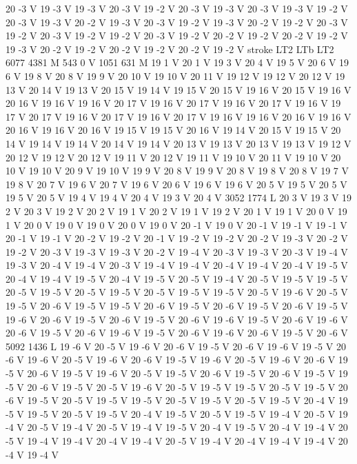 {{{{{20 -3 V
19 -3 V
19 -3 V
20 -3 V
19 -2 V
20 -3 V
19 -3 V
20 -3 V
19 -3 V
19 -2 V
20 -3 V
19 -3 V
20 -2 V
19 -3 V
20 -3 V
19 -2 V
19 -3 V
20 -2 V
19 -2 V
20 -3 V
19 -2 V
20 -3 V
19 -2 V
19 -2 V
20 -3 V
19 -2 V
20 -2 V
19 -2 V
20 -2 V
19 -2 V
19 -3 V
20 -2 V
19 -2 V
20 -2 V
19 -2 V
20 -2 V
19 -2 V
stroke
LT2
LTb
LT2
6077 4381 M
543 0 V
1051 631 M
19 1 V
20 1 V
19 3 V
20 4 V
19 5 V
20 6 V
19 6 V
19 8 V
20 8 V
19 9 V
20 10 V
19 10 V
20 11 V
19 12 V
19 12 V
20 12 V
19 13 V
20 14 V
19 13 V
20 15 V
19 14 V
19 15 V
20 15 V
19 16 V
20 15 V
19 16 V
20 16 V
19 16 V
19 16 V
20 17 V
19 16 V
20 17 V
19 16 V
20 17 V
19 16 V
19 17 V
20 17 V
19 16 V
20 17 V
19 16 V
20 17 V
19 16 V
19 16 V
20 16 V
19 16 V
20 16 V
19 16 V
20 16 V
19 15 V
19 15 V
20 16 V
19 14 V
20 15 V
19 15 V
20 14 V
19 14 V
19 14 V
20 14 V
19 14 V
20 13 V
19 13 V
20 13 V
19 13 V
19 12 V
20 12 V
19 12 V
20 12 V
19 11 V
20 12 V
19 11 V
19 10 V
20 11 V
19 10 V
20 10 V
19 10 V
20 9 V
19 10 V
19 9 V
20 8 V
19 9 V
20 8 V
19 8 V
20 8 V
19 7 V
19 8 V
20 7 V
19 6 V
20 7 V
19 6 V
20 6 V
19 6 V
19 6 V
20 5 V
19 5 V
20 5 V
19 5 V
20 5 V
19 4 V
19 4 V
20 4 V
19 3 V
20 4 V
3052 1774 L
20 3 V
19 3 V
19 2 V
20 3 V
19 2 V
20 2 V
19 1 V
20 2 V
19 1 V
19 2 V
20 1 V
19 1 V
20 0 V
19 1 V
20 0 V
19 0 V
19 0 V
20 0 V
19 0 V
20 -1 V
19 0 V
20 -1 V
19 -1 V
19 -1 V
20 -1 V
19 -1 V
20 -2 V
19 -2 V
20 -1 V
19 -2 V
19 -2 V
20 -2 V
19 -3 V
20 -2 V
19 -2 V
20 -3 V
19 -3 V
19 -3 V
20 -2 V
19 -4 V
20 -3 V
19 -3 V
20 -3 V
19 -4 V
19 -3 V
20 -4 V
19 -4 V
20 -3 V
19 -4 V
19 -4 V
20 -4 V
19 -4 V
20 -4 V
19 -5 V
20 -4 V
19 -4 V
19 -5 V
20 -4 V
19 -5 V
20 -5 V
19 -4 V
20 -5 V
19 -5 V
19 -5 V
20 -5 V
19 -5 V
20 -5 V
19 -5 V
20 -5 V
19 -5 V
19 -5 V
20 -5 V
19 -6 V
20 -5 V
19 -5 V
20 -6 V
19 -5 V
19 -5 V
20 -6 V
19 -5 V
20 -6 V
19 -5 V
20 -6 V
19 -5 V
19 -6 V
20 -6 V
19 -5 V
20 -6 V
19 -5 V
20 -6 V
19 -6 V
19 -5 V
20 -6 V
19 -6 V
20 -6 V
19 -5 V
20 -6 V
19 -6 V
19 -5 V
20 -6 V
19 -6 V
20 -6 V
19 -5 V
20 -6 V
5092 1436 L
19 -6 V
20 -5 V
19 -6 V
20 -6 V
19 -5 V
20 -6 V
19 -6 V
19 -5 V
20 -6 V
19 -6 V
20 -5 V
19 -6 V
20 -6 V
19 -5 V
19 -6 V
20 -5 V
19 -6 V
20 -6 V
19 -5 V
20 -6 V
19 -5 V
19 -6 V
20 -5 V
19 -5 V
20 -6 V
19 -5 V
20 -6 V
19 -5 V
19 -5 V
20 -6 V
19 -5 V
20 -5 V
19 -6 V
20 -5 V
19 -5 V
19 -5 V
20 -5 V
19 -5 V
20 -6 V
19 -5 V
20 -5 V
19 -5 V
19 -5 V
20 -5 V
19 -5 V
20 -5 V
19 -5 V
20 -4 V
19 -5 V
19 -5 V
20 -5 V
19 -5 V
20 -4 V
19 -5 V
20 -5 V
19 -5 V
19 -4 V
20 -5 V
19 -4 V
20 -5 V
19 -4 V
20 -5 V
19 -4 V
19 -5 V
20 -4 V
19 -5 V
20 -4 V
19 -4 V
20 -5 V
19 -4 V
19 -4 V
20 -4 V
19 -4 V
20 -5 V
19 -4 V
20 -4 V
19 -4 V
19 -4 V
20 -4 V
19 -4 V
}}}}}
